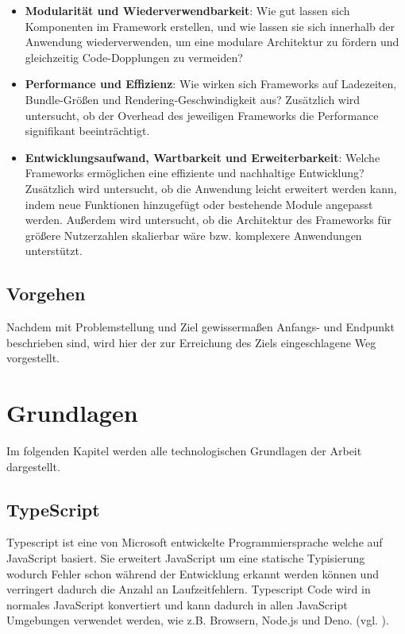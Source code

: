 \documentclass[oneside]{ausarbeitung}
\begin{document}
\begin{itemize}
    \item \textbf{Modularität und Wiederverwendbarkeit}:  
          Wie gut lassen sich Komponenten im Framework erstellen, und wie lassen sie sich innerhalb der Anwendung wiederverwenden, um eine modulare Architektur zu fördern und gleichzeitig Code-Dopplungen zu vermeiden?  
    \item \textbf{Performance und Effizienz}:  
          Wie wirken sich Frameworks auf Ladezeiten, Bundle-Größen und Rendering-Geschwindigkeit aus?  
          Zusätzlich wird untersucht, ob der Overhead des jeweiligen Frameworks die Performance signifikant beeinträchtigt.  
    \item \textbf{Entwicklungsaufwand, Wartbarkeit und Erweiterbarkeit}:  
          Welche Frameworks ermöglichen eine effiziente und nachhaltige Entwicklung?  
          Zusätzlich wird untersucht, ob die Anwendung leicht erweitert werden kann, indem neue Funktionen hinzugefügt oder bestehende Module angepasst werden.  
          Außerdem wird untersucht, ob die Architektur des Frameworks für größere Nutzerzahlen skalierbar wäre bzw. komplexere Anwendungen unterstützt.  
\end{itemize}

\section{Vorgehen}
\label{sec:vorgehen}

Nachdem mit Problemstellung und Ziel gewissermaßen Anfangs- und Endpunkt beschrieben sind, wird hier der zur Erreichung des Ziels eingeschlagene Weg vorgestellt.

\chapter{Grundlagen}
\label{chap:grundlagen}

Im folgenden Kapitel werden alle technologischen Grundlagen der Arbeit dargestellt.
 
\section{TypeScript}
Typescript ist eine von Microsoft entwickelte Programmiersprache welche auf JavaScript basiert. Sie erweitert JavaScript um eine statische Typisierung wodurch Fehler schon während der Entwicklung erkannt werden können und verringert dadurch die Anzahl an Laufzeitfehlern. Typescript Code wird in normales JavaScript konvertiert und kann dadurch in allen JavaScript Umgebungen verwendet werden, wie z.B. Browsern, Node.js und Deno. 
(vgl. \parencite{typescript}). 
\end{document}
